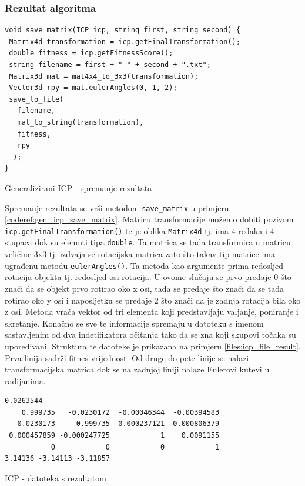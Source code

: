 \subsubsection{Rezultat algoritma}

\begin{listing}[H]
  \begin{verbatim}
void save_matrix(ICP icp, string first, string second) {
 Matrix4d transformation = icp.getFinalTransformation();
 double fitness = icp.getFitnessScore();
 string filename = first + "-" + second + ".txt";
 Matrix3d mat = mat4x4_to_3x3(transformation);
 Vector3d rpy = mat.eulerAngles(0, 1, 2);
 save_to_file(
   filename,
   mat_to_string(transformation),
   fitness,
   rpy
  );
}
  \end{verbatim}
  \caption{Generalizirani ICP - spremanje rezultata}
  \label{coderef:gen_icp_save_matrix}
\end{listing}

Spremanje rezultata se vrši metodom \texttt{save_matrix} u primjeru \ref{coderef:gen_icp_save_matrix}. Matricu transformacije možemo dobiti pozivom \texttt{icp.getFinalTransformation()} te je  oblika \texttt{Matrix4d} tj. ima 4 redaka i 4 stupaca dok su elemnti tipa \texttt{double}. Ta matrica se tada transformira u matricu veličine 3x3 tj. izdvaja se rotacijska matrica zato što takav tip matrice ima ugrađenu metodu \texttt{eulerAngles()}. Ta metoda kao argumente prima redosljed rotacija objekta tj. redosljed osi rotacija. U ovome slučaju se prvo predaje 0 što znači da se objekt prvo rotirao oko x osi, tada se predaje što znači da se tada rotirao oko y osi i naposljetku se predaje 2 što znači da je zadnja rotacija bila oko z osi. Metoda vraća vektor od tri elementa koji predstavljaju valjanje, poniranje i skretanje. Konačno se sve te informacije spremaju u datoteku s imenom sastavljenim od dva indetifikatora očitanja tako da se zna koji skupovi točaka su upoređivani. Struktura te datoteke je prikazana na primjeru  \ref{files:icp_file_result}. Prva linija sadrži fitnes vrijednost. Od druge do pete linije se nalazi transformacijska matrica dok se na zadnjoj liniji nalaze Eulerovi kutevi u radijanima.
\begin{listing}[H]
  \begin{verbatim}
0.0263544
    0.999735   -0.0230172  -0.00046344  -0.00394583
   0.0230173     0.999735  0.000237121  0.000806379
 0.000457859 -0.000247725            1    0.0091155
           0            0            0            1
3.14136 -3.14113 -3.11857
  \end{verbatim}
  \caption{ICP - datoteka s rezultatom}
  \label{files:icp_file_result}
\end{listing}


